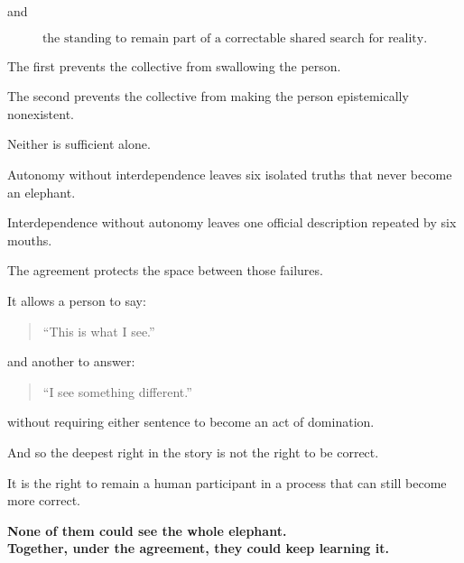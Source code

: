 \documentclass[11pt,a4paper]{article}
\begin{document}
and

\[
\boxed{\text{the standing to remain part of a correctable shared search for reality}.}
\]

The first prevents the collective from swallowing the person.

The second prevents the collective from making the person epistemically nonexistent.

Neither is sufficient alone.

Autonomy without interdependence leaves six isolated truths that never become an elephant.

Interdependence without autonomy leaves one official description repeated by six mouths.

The agreement protects the space between those failures.

It allows a person to say:

\begin{quote}
``This is what I see.''
\end{quote}

and another to answer:

\begin{quote}
``I see something different.''
\end{quote}

without requiring either sentence to become an act of domination.

And so the deepest right in the story is not the right to be correct.

It is the right to remain a human participant in a process that can still become more correct.

\begin{center}
\bigskip
\textbf{None of them could see the whole elephant.}\\
\textbf{Together, under the agreement, they could keep learning it.}
\end{center}
\end{document}
